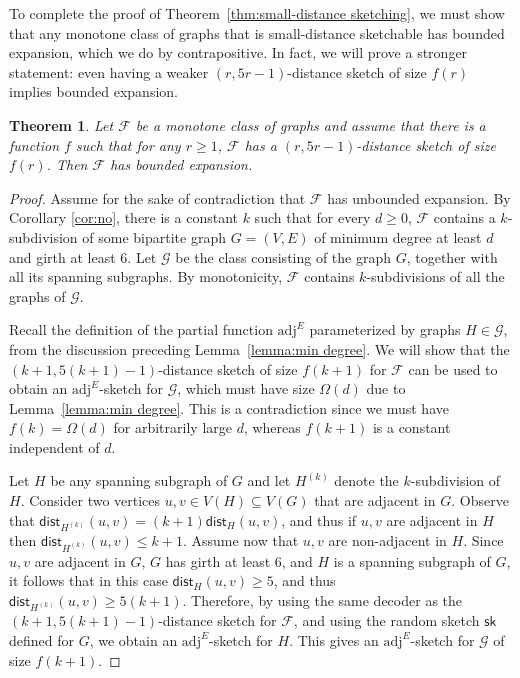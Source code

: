 \documentclass[11pt]{article}
\newtheorem{thm}{Theorem}[section]
\theoremstyle{definition}
\newcommand{\G}{\mathcal{G}}
\newcommand{\sk}{\mathsf{sk}}
\renewcommand{\le}{\leqslant}
\renewcommand{\ge}{\geqslant}
\def\F {{\mathcal F}}
\def\G {{\mathcal G}}
\def\sk {\mathsf{sk}}
\newcommand{\dist}{\mathsf{dist}}
\begin{document}
To complete the proof of Theorem~\ref{thm:small-distance sketching}, we must show that any monotone
class of graphs that is small-distance sketchable has bounded expansion, which we do by
contrapositive. In fact, we will prove a stronger statement: even having a weaker
$(r,5r-1)$-distance sketch of size $f(r)$ implies bounded expansion.

\begin{thm}\label{thm:r2rexpansion}
Let $\mathcal{F}$ be a monotone class of graphs and assume that there is a function $f$ such that
for any $r\ge 1$, $\mathcal{F}$ has a $(r,5r-1)$-distance sketch of size $f(r)$.  Then $\mathcal{F}$
has bounded expansion.
\end{thm}

\begin{proof}
Assume for the sake of contradiction that $\mathcal{F}$ has unbounded expansion.  By Corollary
\ref{cor:no}, there is a constant $k$ such that for every $d\ge 0$, $\mathcal{F}$ contains a
$k$-subdivision of some bipartite graph $G=(V,E)$ of minimum degree at least $d$ and girth at least
6. Let $\mathcal{G}$ be the class consisting of the graph $G$, together with all its spanning
subgraphs. By monotonicity, $\mathcal{F}$ contains $k$-subdivisions of all the graphs of
$\mathcal{G}$.

Recall the definition of the partial function $\mathrm{adj}^E$ parameterized by graphs $H \in \G$,
from the discussion preceding Lemma~\ref{lemma:min degree}. We will show that the $(k+1,
5(k+1)-1)$-distance sketch of size $f(k+1)$ for $\F$ can be used to obtain an $\mathrm{adj}^E$-sketch
for $\G$, which must have size $\Omega(d)$ due to Lemma~\ref{lemma:min degree}. This is a
contradiction since we must have $f(k) = \Omega(d)$ for arbitrarily large $d$, whereas $f(k+1)$
is a constant independent of $d$.

Let $H$ be any spanning subgraph of $G$ and let $H^{(k)}$ denote the $k$-subdivision of $H$.
Consider two vertices $u,v \in V(H) \subseteq V(G)$ that are adjacent in $G$.  Observe that
$\dist_{H^{(k)}}(u,v)=(k+1) \dist_H(u,v)$, and thus if $u,v$ are adjacent in $H$ then
$\dist_{H^{(k)}}(u,v)\le k+1$. Assume now that $u,v$ are non-adjacent in $H$. Since $u,v$ are
adjacent in $G$, $G$ has girth at least 6, and $H$ is a spanning subgraph of $G$, it follows that in
this case $\dist_H(u,v)\ge 5$, and thus $\dist_{H^{(k)}}(u,v)\ge 5(k+1)$. Therefore, by using the
same decoder as the $(k+1,5(k+1)-1)$-distance sketch for $\F$, and using the random sketch $\sk$
defined for $G$, we obtain an $\mathrm{adj}^E$-sketch for $H$. This gives an
$\mathrm{adj}^E$-sketch for $\G$ of size $f(k+1)$.
\end{proof}
\end{document}
